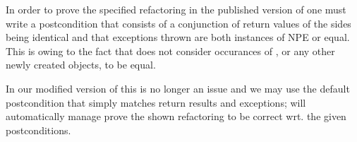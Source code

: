In order to prove the specified  refactoring in the published version of \Refinity{} one must write a postcondition that consists of a conjunction of return values of the sides being identical and
that exceptions thrown are both instances of NPE or equal.
This is owing to the fact that \Refinity{} does not consider occurances of , or any other newly created objects, to be equal.

In our modified version of \Refinity{} this is no longer an issue and we may use the default postcondition that simply matches return results and exceptions;
\Refinity{} will automatically manage prove the shown  refactoring to be correct wrt. the given postconditions.


